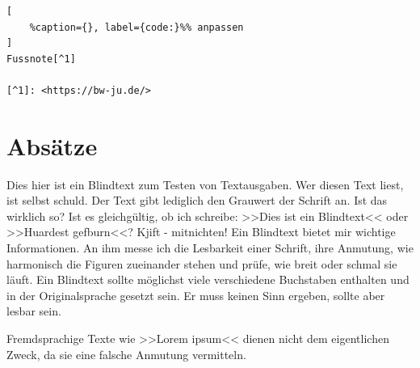 \lstset{language=C}%
\begin{lstlisting}[
	%caption={}, label={code:}%% anpassen
]
Fussnote[^1]       

[^1]: <https://bw-ju.de/>
\end{lstlisting}

\section{Absätze}\label{absaetze}

Dies hier ist ein Blindtext zum Testen von Textausgaben. Wer diesen Text
liest, ist selbst schuld. Der Text gibt lediglich den Grauwert der
Schrift an. Ist das wirklich so? Ist es gleichgültig, ob ich schreibe:
>>Dies ist ein Blindtext<< oder >>Huardest gefburn<<? Kjift -
mitnichten! Ein Blindtext bietet mir wichtige Informationen. An ihm
messe ich die Lesbarkeit einer Schrift, ihre Anmutung, wie harmonisch
die Figuren zueinander stehen und prüfe, wie breit oder schmal sie
läuft. Ein Blindtext sollte möglichst viele verschiedene Buchstaben
enthalten und in der Originalsprache gesetzt sein. Er muss keinen Sinn
ergeben, sollte aber lesbar sein.

Fremdsprachige Texte wie >>Lorem ipsum<< dienen nicht dem eigentlichen
Zweck, da sie eine falsche Anmutung vermitteln.
